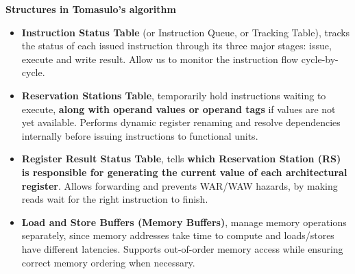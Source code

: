\highspace
\begin{flushleft}
    \textcolor{Green3}{ \textbf{Structures in Tomasulo's algorithm}}
\end{flushleft}
\begin{itemize}
    \item \textbf{Instruction Status Table} (or Instruction Queue, or Tracking Table), tracks the status of each issued instruction through its three major stages: issue, execute and write result. Allow us to monitor the instruction flow cycle-by-cycle.
    
    \item \textbf{Reservation Stations Table}, temporarily hold instructions waiting to execute, \textbf{along with operand values or operand tags} if values are not yet available. Performs dynamic register renaming and resolve dependencies internally before issuing instructions to functional units.

    \item \textbf{Register Result Status Table}, tells \textbf{which Reservation Station (RS) is responsible for generating the current value of each architectural register}. Allows forwarding and prevents WAR/WAW hazards, by making reads wait for the right instruction to finish.
    
    \item \textbf{Load and Store Buffers (Memory Buffers)}, manage memory operations separately, since memory addresses take time to compute and loads/stores have different latencies. Supports out-of-order memory access while ensuring correct memory ordering when necessary.
\end{itemize}

